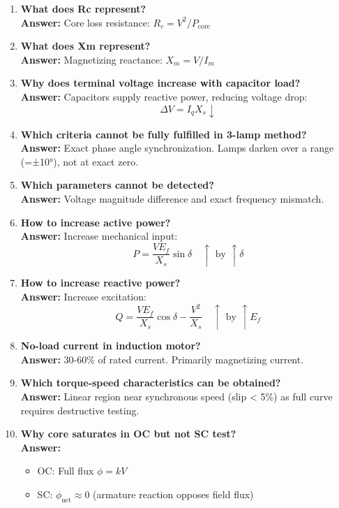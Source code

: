 \documentclass[12pt,a4paper]{article}
\begin{document}
\begin{enumerate}
		\item \textbf{What does Rc represent?} \\
		\textbf{Answer:} Core loss resistance: $R_c = V^2 / P_{\text{core}}$
		
		\item \textbf{What does Xm represent?} \\
		\textbf{Answer:} Magnetizing reactance: $X_m = V / I_m$
		
		\item \textbf{Why does terminal voltage increase with capacitor load?} \\
		\textbf{Answer:} Capacitors supply reactive power, reducing voltage drop:
		\[
		\Delta V = I_qX_s \downarrow
		\]
		
		\item \textbf{Which criteria cannot be fully fulfilled in 3-lamp method?} \\
		\textbf{Answer:} Exact phase angle synchronization. Lamps darken over a range (=±10°), not at exact zero.
		
		\item \textbf{Which parameters cannot be detected?} \\
		\textbf{Answer:} Voltage magnitude difference and exact frequency mismatch.
		
		\item \textbf{How to increase active power?} \\
		\textbf{Answer:} Increase mechanical input:
		\[
		P = \frac{VE_f}{X_s}\sin\delta \quad \uparrow \text{ by } \uparrow \delta
		\]
		
		\item \textbf{How to increase reactive power?} \\
		\textbf{Answer:} Increase excitation:
		\[
		Q = \frac{VE_f}{X_s}\cos\delta - \frac{V^2}{X_s} \quad \uparrow \text{ by } \uparrow E_f
		\]
		
		\item \textbf{No-load current in induction motor?} \\
		\textbf{Answer:} 30-60\% of rated current. Primarily magnetizing current.
		
		\item \textbf{Which torque-speed characteristics can be obtained?} \\
		\textbf{Answer:} Linear region near synchronous speed (slip < 5\%) as full curve requires destructive testing.
		
		\item \textbf{Why core saturates in OC but not SC test?} \\
		\textbf{Answer:} 
		\begin{itemize}
			\item OC: Full flux $\phi = kV$
			\item SC: $\phi_{\text{net}} \approx 0$ (armature reaction opposes field flux)
		\end{itemize}
		

\end{enumerate}
\end{document}
